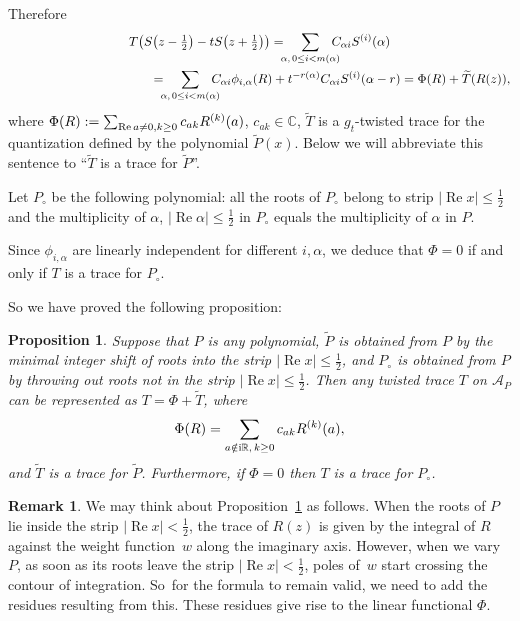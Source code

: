 \documentclass[10pt,a4paper]{amsart}
\newcommand{\RN}{\mathbb{R}} %
\newcommand{\CN}{\mathbb{C}} %
\newcommand{\suml}{\sum\limits}
\renewcommand{\Re}{\operatorname{Re}}
\newtheorem{Proposition}[Theorem]{Proposition}
\theoremstyle{definition}
\newtheorem{Remark}[Theorem]{Remark}
\numberwithin{equation}{section}
\begin{document}
Therefore
\begin{gather*}
T\big(S\big(z-\tfrac{1}{2}\big)-tS\big(z+\tfrac{1}{2}\big)\big)=\!\!\!\sum_{\alpha,\,0\le i<m(\alpha)}\!\!\!\!\!C_{\alpha i} S^{(i)}(\alpha)
\\ \hphantom{T\big(S\big(z-\tfrac{1}{2}\big)-tS\big(z+\tfrac{1}{2}\big)\big)}
{}=\!\!\!\sum_{\alpha,\,0\le i<m(\alpha)}\!\!\!\!\!C_{\alpha i} \phi_{i,\alpha}(R)+t^{-r(\alpha)}C_{\alpha i} S^{(i)}(\alpha-r)=\Phi(R)+\widetilde{T}(R(z)),
\end{gather*}
where $\Phi(R):=\suml\nolimits_{\Re a\neq 0,k\ge 0}c_{ak} R^{(k)}(a)$, $c_{ak}\in \CN$, $\widetilde{T}$ is a $g_t$-twisted trace for the quantization defined by the polynomial $\widetilde{P}(x)$. Below we will abbreviate this sentence to ``$\widetilde{T}$ is a trace for $\widetilde{P}$''.

Let $P_\circ$ be the following polynomial: all the roots of $P_\circ$ belong to strip $|\Re x|\leq \frac{1}{2}$ and the multiplicity of $\alpha$, $|\Re\alpha|\leq \frac{1}{2}$ in $P_\circ$ equals the multiplicity of $\alpha$ in $P$.

Since $\phi_{i,\alpha}$ are linearly independent for different $i,\alpha$, we deduce that $\Phi=0$ if and only if $T$ is a trace for $P_\circ$.

So we have proved the following proposition:
\begin{Proposition}
\label{PropGeneralTrace}
Suppose that $P$ is any polynomial, $\widetilde{P}$ is obtained from $P$ by the minimal integer shift of roots into the strip $|\Re x|\leq \frac{1}{2}$, and $P_\circ$ is obtained from $P$ by throwing out roots not in the strip $|\Re x|\leq \frac{1}{2}$. Then any twisted trace $T$ on $\mathcal A_P$ can be represented as $T=\Phi+\widetilde{T}$, where
\[
\Phi(R)=\sum_{a\notin {\rm i}\RN,\,k\ge 0} c_{a k} R^{(k)}(a),
\]
and $\widetilde{T}$ is a trace for $\widetilde{P}$. Furthermore, if $\Phi=0$ then $T$ is a trace for $P_\circ$.
\end{Proposition}

\begin{Remark} We may think about Proposition~\ref{PropGeneralTrace} as follows.
When the roots of $P$ lie inside the strip $|\Re x|<\frac{1}{2}$, the trace of $R(z)$ is given by
the integral of $R$ against the weight function~$w$ along the imaginary axis.
However, when we vary~$P$, as soon as its roots leave the strip $|\Re x|<\frac{1}{2}$,
poles of~$w$ start crossing the contour of integration. So~for the formula to remain valid,
we need to add the residues resulting from this. These residues give rise to the linear functional $\Phi$.
\end{Remark}
\end{document}
